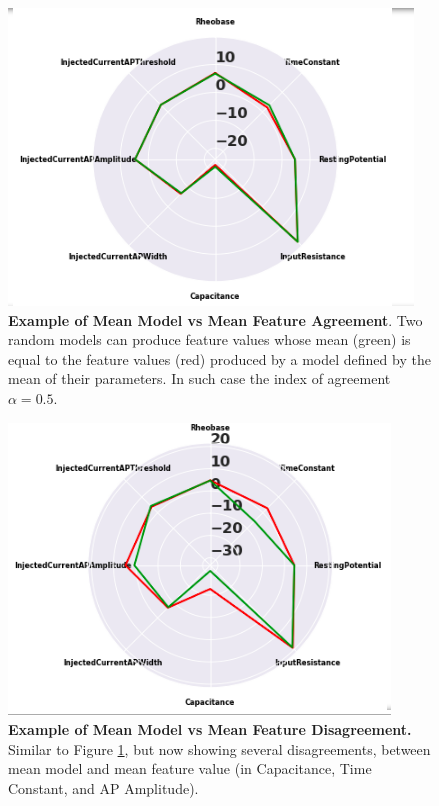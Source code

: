 \begin{figure}
    \centering
    \includegraphics{figures/model_similarities.png}
    \caption[Example of Mean Model vs Mean Feature Agreement]{\textbf{Example of Mean Model vs Mean Feature Agreement}.
    Two random models can produce feature values whose mean (green) is equal to the feature values (red) produced by a model defined by the mean of their parameters.
    In such case the index of agreement $\alpha=0.5$.}
    \label{fig:mean-model-3}
\end{figure}

\begin{figure}
    \centering
    \includegraphics{figures/model_differences.png}
    \caption[Example of Mean Model vs Mean Feature Disagreement]{\textbf{Example of Mean Model vs Mean Feature Disagreement.} Similar to Figure \ref{fig:mean-model-3}, but now showing several disagreements, between mean model and mean feature value (in Capacitance, Time Constant, and AP Amplitude).}
    \label{fig:mean-model-4}
\end{figure}

